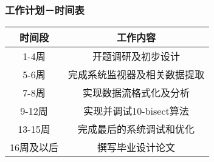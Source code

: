 \documentclass[xcolor=dvipsnames,11pt]{beamer}
\begin{document}
\begin{frame}
\frametitle{工作计划－时间表}
{
\center
\begin{tabular}{c||c}
时间段 & 工作内容\\
\hline
1-4周 & 开题调研及初步设计\\
\hline
5-6周 & 完成系统监视器及相关数据提取\\
\hline
7-8周 & 实现数据流格式化及分析\\
\hline
9-12周 & 实现并调试10-bisect算法\\
\hline
13-15周 & 完成最后的系统调试和优化\\ 
\hline
16周及以后 & 撰写毕业设计论文
\end{tabular}

}
\end{frame}





\end{document}
